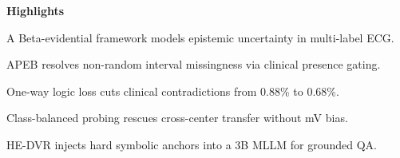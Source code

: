 \documentclass[12pt]{article}
\begin{document}
\begin{center}
{\Large\bfseries Highlights}
\end{center}

\noindent A Beta-evidential framework models epistemic uncertainty in multi-label ECG.

\vspace{0.8em}
\noindent APEB resolves non-random interval missingness via clinical presence gating.

\vspace{0.8em}
\noindent One-way logic loss cuts clinical contradictions from 0.88\% to 0.68\%.

\vspace{0.8em}
\noindent Class-balanced probing rescues cross-center transfer without mV bias.

\vspace{0.8em}
\noindent HE-DVR injects hard symbolic anchors into a 3B MLLM for grounded QA.
\end{document}
